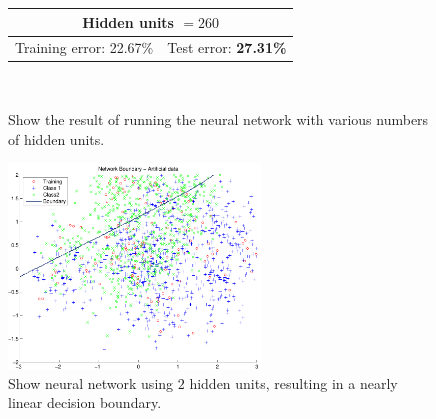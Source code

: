\begin{figure}[!htbp]
{\begin{tabular}{|c|c|}
      \hline
      \multicolumn{2}{|c|}{Hidden units $= 260$} \\
      \hline
      Training error: 22.67\% & Test error: \textbf{27.31\%} \\
      \hline
    \end{tabular}
  } 
   \\
  \caption{Show the result of running the neural network with various
    numbers of hidden units.}
  \label{fig:q210hidden}
\end{figure}

\begin{figure}[!htbp]
  \centering
  \includegraphics[width=0.6\textwidth]{./images/q210a_Nh2}
  \caption{Show neural network using $2$ hidden units, resulting in a
    nearly linear decision boundary.}
  \label{fig:q210Nh2}
\end{figure}


